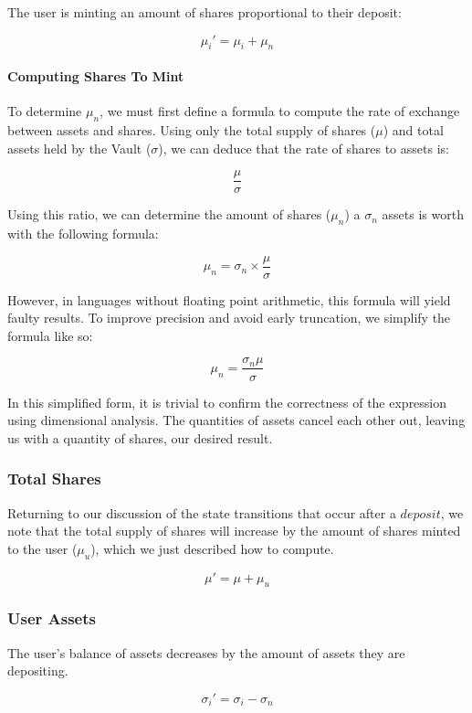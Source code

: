 \documentclass{article}
\begin{document}
The user is minting an amount of shares proportional to their deposit:

$$ \mu_i' = \mu_i + \mu_n $$

\paragraph{Computing Shares To Mint}

To determine $\mu_n$, we must first define a formula to compute the rate of exchange between assets and shares. Using only the total supply of shares ($\mu$) and total assets held by the Vault ($\sigma$), we can deduce that the rate of shares to assets is:

$$ \frac{\mu}{\sigma} $$

Using this ratio, we can determine the amount of shares ($\mu_n$) a $\sigma_n$ assets is worth with the following formula:

$$ \mu_n = \sigma_n \times \frac{\mu}{\sigma} $$

However, in languages without floating point arithmetic, this formula will yield faulty results. To improve precision and avoid early truncation, we simplify the formula like so:

$$ \mu_n = \frac{\sigma_n\mu}{\sigma} $$

In this simplified form, it is trivial to confirm the correctness of the expression using dimensional analysis. The quantities of assets cancel each other out, leaving us with a quantity of shares, our desired result.

\subsubsection{Total Shares}

Returning to our discussion of the state transitions that occur after a $deposit$, we note that the total supply of shares will increase by the amount of shares minted to the user ($\mu_{u}$), which we just described how to compute.

$$ \mu' = \mu + \mu_{u} $$

\subsubsection{User Assets}

The user's balance of assets decreases by the amount of assets they are depositing.

$$ \sigma_i' = \sigma_i - \sigma_n $$
\end{document}
